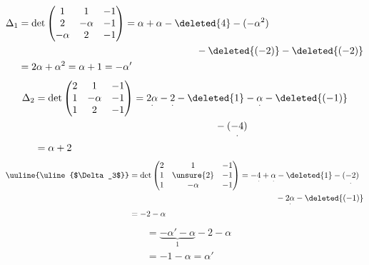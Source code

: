 \[
\begin{aligned}
\Delta_1&=\det\begin{pmatrix}1&1&-1\\2&-\alpha&-1\\-\alpha&2&-1\end{pmatrix}
=\alpha+\alpha-\deleted{4}-(-\alpha^2)\\
&\hspace{18em}-\deleted{(-2)}-\deleted{(-2)}\\
&=2\alpha+\alpha^2=\alpha+1=-\alpha'
\end{aligned}
\]
\[
\begin{aligned}
\Delta_2&=\det\begin{pmatrix}2&1&-1\\1&-\alpha&-1\\1&2&-1\end{pmatrix}
=\underset{\cdot}{2\alpha}-\underset{\cdot}{2}-\deleted{1}-\underset{\cdot}{\alpha}-\deleted{(-1)}\\
&\hspace{18em}-\underset{\cdot}{(-4)}\\
&=\alpha+2
\end{aligned}
\]
\[
\begin{aligned}
\text{\uuline{\uline{$\Delta_3$}}}&=\det\begin{pmatrix}2&1&-1\\1&\unsure{2}&-1\\1&-\alpha&-1\end{pmatrix}
=-\underset{\cdot}{4}+\underset{\cdot}{\alpha}-\deleted{1}-\underset{\cdot}{(-2)}\\
&\hspace{18em}-\underset{\cdot}{2\alpha}-\deleted{(-1)}\\
&=-2-\alpha
\end{aligned}
\]
\[
\begin{aligned}
&=\underbrace{-\alpha'-\alpha}_{1}-2-\alpha\\
&=-1-\alpha=\alpha'
\end{aligned}
\]


